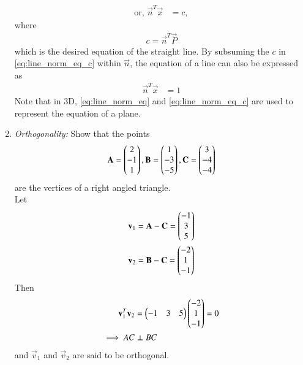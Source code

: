 \begin{enumerate}[label=\thesubsection.\arabic*.,ref=\thesubsection.\theenumi]
\begin{align}
\\
\text{or, } \vec{n}^T\vec{x} &= c,
\label{eq:line_norm_eq_c}
\end{align}
%
where
\begin{align}
c = \vec{n}^T\vec{P}
\end{align}
which is the desired  equation of the straight line.  By subsuming the $c$ in \eqref{eq:line_norm_eq_c} within $\vec{n}$, the equation of a line can also be expressed as
\begin{align}
\label{eq:line_norm_eq_unit}
\vec{n}^T\vec{x} &= 1
\end{align}
%
Note that in 3D, \eqref{eq:line_norm_eq} and \eqref{eq:line_norm_eq_c} are used to represent the equation of a plane. 

\item {\em Orthogonality: }Show that the points
\begin{align}
\mathbf{A} = \begin{pmatrix}2\\-1\\1\end{pmatrix}, 
\mathbf{B} = \begin{pmatrix}1\\-3\\-5\end{pmatrix}, 
\mathbf{C} = \begin{pmatrix}3\\-4\\-4\end{pmatrix} 
\end{align}
%
are the vertices of a right angled triangle.
\\
\solution Let 
\begin{align}
\mathbf{v}_1 &= \mathbf{A}-\mathbf{C} = \begin{pmatrix}-1\\3\\5\end{pmatrix} 
\\
\mathbf{v}_2 &= \mathbf{B}-\mathbf{C} = \begin{pmatrix}-2\\1\\-1\end{pmatrix} 
\end{align}
Then 
\begin{align}
\mathbf{v}_1^T\mathbf{v}_2  &=  \begin{pmatrix}-1&3&5\end{pmatrix}  \begin{pmatrix}-2\\1\\-1\end{pmatrix} =0
\\
\implies AC &\perp BC
\end{align}
and $\vec{v}_1$ and $\vec{v}_2$ are said to be orthogonal. 


\end{enumerate}
